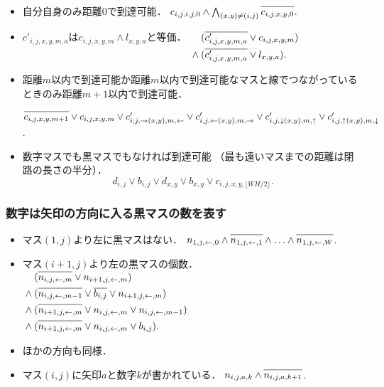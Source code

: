 \documentclass[a4j]{jarticle}
\newcommand{\N}[1]{\overline{#1\vphantom{l}}}
\newcommand{\←}{{\leftarrow}}
\newcommand{\→}{{\rightarrow}}
\newcommand{\↑}{{\uparrow}}
\newcommand{\↓}{{\downarrow}}
\begin{document}
\begin{itemize}
\item 自分自身のみ距離0で到達可能．
  $c_{i,j,i,j,0}\land \bigwedge_{(x,y)\ne(i,j)} \N{c_{i,j,x,y,0}}$.

\item $c'_{i,j,x,y,m,a}$は$c_{i,j,x,y,m}\land l_{x,y,a}$と等価．
  \quad
  $\begin{aligned}[t]
   &(\N{c'_{i,j,x,y,m,a}}\lor{c_{i,j,x,y,m}})\\{}\land{}
   &(\N{c'_{i,j,x,y,m,a}}\lor{l_{x,y,a}}).
   \end{aligned}$

\item 距離$m$以内で到達可能か距離$m$以内で到達可能なマスと線でつながっている
  ときのみ距離$m+1$以内で到達可能．
   \par\qquad
     $\N{c_{i,j,x,y,m+1}}\lor
      c_{i,j,x,y,m}\lor
      c'_{i,j,\→(x,y),m,\←}\lor
      c'_{i,j,\←(x,y),m,\→}\lor
      c'_{i,j,\↓(x,y),m,\↑}\lor
      c'_{i,j,\↑(x,y),m,\↓}$.

\item 数字マスでも黒マスでもなければ到達可能
  （最も遠いマスまでの距離は閉路の長さの半分）．
  \begin{equation}
   d_{i,j}\lor b_{i,j}\lor
   d_{x,y}\lor b_{x,y}\lor
   c_{i,j,x,y,\lfloor WH/2\rfloor}.
   \label{eq:reachability}
  \end{equation}
\end{itemize}

\subsubsection{数字は矢印の方向に入る黒マスの数を表す}

\begin{itemize}
\item マス$(1,j)$より左に黒マスはない．
$n_{1,j,\←,0}
\land \N{n_{1,j,\←,1}} \land\ldots\land \N{n_{1,j,\←,W}}$.

\item マス$(i+1,j)$より左の黒マスの個数．
  $\begin{aligned}[t]
   &(\N{n_{i,j,\←,m}}\lor n_{i+1,j,\←,m})\\{}\land{}
   &(\N{n_{i,j,\←,m-1}}\lor\N{b_{i,j}}\lor n_{i+1,j,\←,m})\\{}\land{}
   &(\N{n_{i+1,j,\←,m}}\lor n_{i,j,\←,m}\lor n_{i,j,\←,m-1})\\
   {}\land{}
   &(\N{n_{i+1,j,\←,m}}\lor n_{i,j,\←,m}\lor b_{i,j}).
   \end{aligned}$

\item ほかの方向も同様．

\item マス$(i,j)$に矢印$a$と数字$k$が書かれている．
  $n_{i,j,a,k}\land\N{n_{i,j,a,k+1}}$.
\end{itemize}
\end{document}
